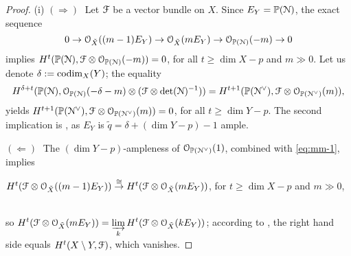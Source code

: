 \documentclass[11pt,reqno]{amsart}
\let\euf\EuScript
\let\mbb\mathbb
\let\tld\tilde
\let\nit\noindent
\let\disp\displaystyle
\let\srel\stackrel
\numberwithin{equation}{section}
\numberwithin{figure}{section}
\let\sm\setminus
\let\ges\geqslant
\begin{document}
\begin{proof}
\nit(i) $(\Rightarrow)\;$ Let ${{\euf F}}$ be a vector bundle on $X$. 
Since $E_Y=\mbb P({{\euf N}})$, the exact sequence 
\begin{equation}\label{eq:mm-1}
0\to{{\euf O}}_{\tld X}((m-1)E_Y)\to{{\euf O}}_{\tld X}(mE_Y)\to{{\euf O}}_{\mbb P({{\euf N}})}(-m)\to 0
\end{equation}
implies $H^t(\mbb P({{\euf N}}),{{\euf F}}\otimes{{\euf O}}_{\mbb P({{\euf N}})}(-m))=0$, 
for all $t\ges\dim X-p$ and $m\gg0$. 
Let us denote $\delta:={{\rm codim}}_X(Y)$; the equality 
\begin{equation}\label{eq:PN}
H^{\delta+t}
(\mbb P({{\euf N}}),{{\euf O}}_{\mbb P({{\euf N}})}(-\delta-m)\otimes({{\euf F}}\otimes{{\rm det}}({{\euf N}})^{-1}))
= H^{t+1}(\mbb P({{\euf N}}^\vee),{{\euf F}}\otimes{{\euf O}}_{\mbb P({{\euf N}}^\vee)}(m)),
\end{equation}
yields $H^{t+1}(\mbb P({{\euf N}}^\vee),{{\euf F}}\otimes{{\euf O}}_{\mbb P({{\euf N}}^\vee)}(m))=0$, 
for all $t\ges\dim Y-p$. The second implication is \cite[Proposition 5.1]{ot}, 
as $E_Y$ is $\tld q=\delta+(\dim Y-p)-1$ ample. 

\nit$(\Leftarrow)\;$ The $(\dim Y-p)$-ampleness of ${{\euf O}}_{\mbb P({{\euf N}}^\vee)}(1)$, 
combined with \eqref{eq:mm-1}, implies 
\\[.5ex] \centerline{
$H^t({{\euf F}}\otimes{{\euf O}}_{\tld X}((m-1)E_Y))\srel{\cong}{\to}
H^t({{\euf F}}\otimes{{\euf O}}_{\tld X}(mE_Y))$, for $t\ges\dim X-p$ and $m\gg0$,
}\\[1ex] 
so 
$\disp H^t({{\euf F}}\otimes{{\euf O}}_{\tld X}(mE_Y))
=\varinjlim_{k}H^t({{\euf F}}\otimes{{\euf O}}_{\tld X}(kE_Y))$; 
according to \cite[(5.1)]{ot}, the right hand side equals $H^t(X\sm Y,{{\euf F}})$, 
which vanishes. 
\smallskip 


\end{proof}
\end{document}

